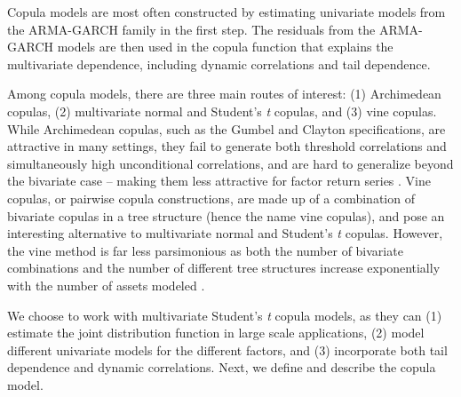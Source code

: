 Copula models are most often constructed by estimating univariate models from the ARMA-GARCH family in the first step. The residuals from the ARMA-GARCH models are then used in the copula function that explains the multivariate dependence, including dynamic correlations and tail dependence.

Among copula models, there are three main routes of interest: (1) Archimedean copulas, (2) multivariate normal and Student's \textit{t} copulas, and (3) vine copulas. While Archimedean copulas, such as the Gumbel and Clayton specifications, are attractive in many settings, they fail to generate both threshold correlations and simultaneously high unconditional correlations, and are hard to generalize beyond the bivariate case -- making them less attractive for factor return series \textcite{ChristoffersenLanglois2013}. Vine copulas, or pairwise copula constructions, are made up of a combination of bivariate copulas in a tree structure (hence the name vine copulas), and pose an interesting alternative to multivariate normal and Student's \textit{t} copulas. However, the vine method is far less parsimonious as both the number of bivariate combinations and the number of different tree structures increase exponentially with the number of assets modeled \autocite{Aas2009}.

We choose to work with multivariate Student's \textit{t} copula models, as they can (1) estimate the joint distribution function in large scale applications, (2) model different univariate models for the different factors, and (3) incorporate both tail dependence and dynamic correlations. Next, we define and describe the copula model.